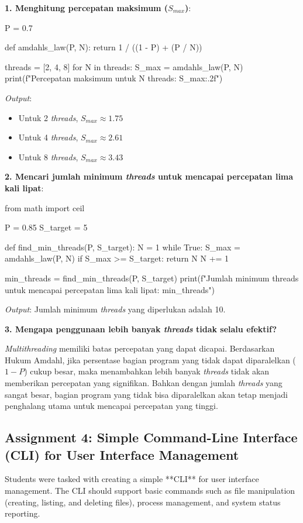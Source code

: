 \documentclass[12pt]{article}
\begin{document}
\textbf{1. Menghitung percepatan maksimum (\(S_{max}\))}:

\begin{python}
P = 0.7

def amdahls_law(P, N):
    return 1 / ((1 - P) + (P / N))

threads = [2, 4, 8]
for N in threads:
    S_max = amdahls_law(P, N)
    print(f"Percepatan maksimum untuk {N} threads: {S_max:.2f}")
\end{python}
\textit{Output}:
\begin{itemize}
    \item Untuk 2 \textit{threads}, \(S_{max} \approx 1.75\)
    \item Untuk 4 \textit{threads}, \(S_{max} \approx 2.61\)
    \item Untuk 8 \textit{threads}, \(S_{max} \approx 3.43\)
\end{itemize}

\textbf{2. Mencari jumlah minimum \textit{threads} untuk mencapai percepatan lima kali lipat}:

\begin{python}
from math import ceil

P = 0.85
S_target = 5

def find_min_threads(P, S_target):
    N = 1
    while True:
        S_max = amdahls_law(P, N)
        if S_max >= S_target:
            return N
        N += 1

min_threads = find_min_threads(P, S_target)
print(f"Jumlah minimum threads untuk mencapai percepatan lima kali lipat: {min_threads}")
\end{python}
\textit{Output}: Jumlah minimum \textit{threads} yang diperlukan adalah 10.

\textbf{3. Mengapa penggunaan lebih banyak \textit{threads} tidak selalu efektif?}

\textit{Multithreading} memiliki batas percepatan yang dapat dicapai. Berdasarkan Hukum Amdahl, jika persentase bagian program yang tidak dapat diparalelkan (\(1 - P\)) cukup besar, maka menambahkan lebih banyak \textit{threads} tidak akan memberikan percepatan yang signifikan. Bahkan dengan jumlah \textit{threads} yang sangat besar, bagian program yang tidak bisa diparalelkan akan tetap menjadi penghalang utama untuk mencapai percepatan yang tinggi.

\subsection{Assignment 4: Simple Command-Line Interface (CLI) for User Interface Management}
Students were tasked with creating a simple **CLI** for user interface management. The CLI should support basic commands such as file manipulation (creating, listing, and deleting files), process management, and system status reporting.
\end{document}
